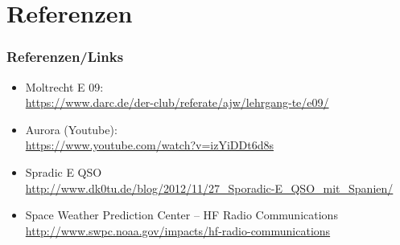 


\section*{Referenzen}

\begin{frame}
  \frametitle{Referenzen/Links}

  \footnotesize
  \begin{itemize}
    \item Moltrecht E 09: \\
      \url{https://www.darc.de/der-club/referate/ajw/lehrgang-te/e09/}
    \item Aurora (Youtube): \\
      \url{https://www.youtube.com/watch?v=izYiDDt6d8s}
    \item Spradic E QSO \\
      \url{http://www.dk0tu.de/blog/2012/11/27_Sporadic-E_QSO_mit_Spanien/}
    \item Space Weather Prediction Center -- HF Radio Communications \\
      \url{http://www.swpc.noaa.gov/impacts/hf-radio-communications}
  \end{itemize}

\end{frame}


